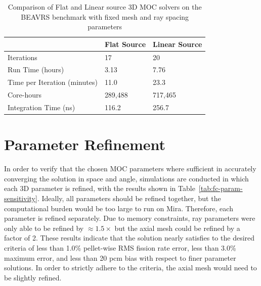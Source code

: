 \begin{table}[ht]
	\centering
	\caption{Comparison of Flat and Linear source 3D \ac{MOC} solvers on the BEAVRS benchmark with fixed mesh and ray spacing parameters}
	\medskip
	\begin{tabular}{l|l|l}
		\hline
		 & Flat Source & Linear Source \\
		\hline
		Iterations & 17 & 20 \\
		Run Time (hours) & 3.13 & 7.76 \\
		Time per Iteration (minutes) & 11.0 & 23.3 \\
		Core-hours & 289,488 & 717,465 \\
		Integration Time (ns) & 116.2 & 256.7 \\
		\hline
	\end{tabular}
	\label{tab:fc-comp-flat-linear}
\end{table}

\section{Parameter Refinement}
\label{sec:fc-parameter-refinement}

In order to verify that the chosen \ac{MOC} parameters where sufficient in accurately converging the solution in space and angle, simulations are conducted in which each 3D parameter is refined, with the results shown in Table~\ref{tab:fc-param-sensitivity}. Ideally, all parameters should be refined together, but the computational burden would be too large to run on Mira. Therefore, each parameter is refined separately. Due to memory constraints, ray parameters were only able to be refined by $\approx 1.5 \times$ but the axial mesh could be refined by a factor of 2. These results indicate that the solution nearly satisfies to the desired criteria of less than 1.0\% pellet-wise \ac{RMS} fission rate error, less than 3.0\% maximum error, and less than 20 pcm bias with respect to finer parameter solutions. In order to strictly adhere to the criteria, the axial mesh would need to be slightly refined.

